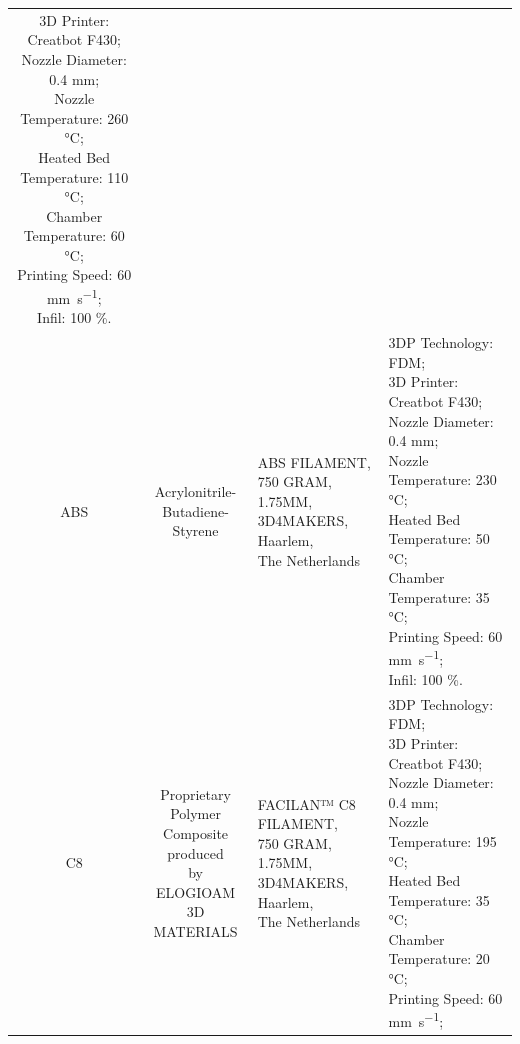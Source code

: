 \begin{table}
\begin{tabularx}{325px}{c c l l}
{3D Printer: Creatbot F430;\\
Nozzle Diameter: 0.4 \si{\milli\meter};\\
Nozzle Temperature: 260 \si{\celsius};\\
Heated Bed Temperature: 110 \si{\celsius};\\
Chamber Temperature: 60 \si{\celsius};\\
Printing Speed: 60 \si{\milli\meter\per\second};\\
Infil: 100 \si{\percent}.}
\\ \cmidrule(l){1-4}
ABS		
& \makecell{Acrylonitrile-\\Butadiene-\\Styrene}
& \makecell[l]{ABS FILAMENT,\\ 750 GRAM,\\ 1.75MM,\\ 3D4MAKERS, Haarlem,\\ The Netherlands}
& \makecell[l]{
3DP Technology: FDM;\\
3D Printer: Creatbot F430;\\
Nozzle Diameter: 0.4 \si{\milli\meter};\\
Nozzle Temperature: 230 \si{\celsius};\\
Heated Bed Temperature: 50 \si{\celsius};\\
Chamber Temperature: 35 \si{\celsius};\\
Printing Speed: 60 \si{\milli\meter\per\second};\\
Infil: 100 \si{\percent}.}
\\ \cmidrule(l){1-4}
C8		
& \makecell{Proprietary Polymer\\ Composite produced\\ by ELOGIOAM 3D\\ MATERIALS}
& \makecell[l]{FACILAN™ C8 FILAMENT,\\ 750 GRAM,\\ 1.75MM,\\ 3D4MAKERS, Haarlem,\\ The Netherlands}
& \makecell[l]{
3DP Technology: FDM;\\
3D Printer: Creatbot F430;\\
Nozzle Diameter: 0.4 \si{\milli\meter};\\
Nozzle Temperature: 195 \si{\celsius};\\
Heated Bed Temperature: 35 \si{\celsius};\\
Chamber Temperature: 20 \si{\celsius};\\
Printing Speed: 60 \si{\milli\meter\per\second};\\
}
\end{tabularx}
\end{table}
